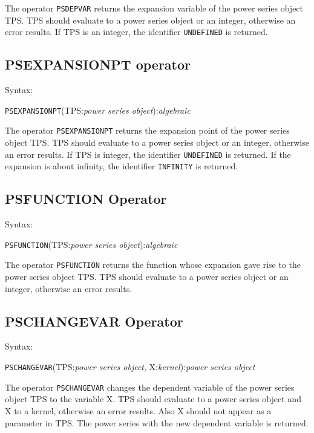 The operator {\tt PSDEPVAR} returns the expansion variable of the
power series object TPS. TPS should evaluate to a power
series object or an integer, otherwise an error results. If TPS
is an integer, the identifier {\tt UNDEFINED} is returned.

\subsection{PSEXPANSIONPT operator}

Syntax:

\hspace*{2em}
{\tt PSEXPANSIONPT}(TPS:{\em power series object}):{\em algebraic}

The operator {\tt PSEXPANSIONPT} returns the expansion point of the
power series object TPS. TPS should evaluate to a power
series object or an integer, otherwise an error results. If TPS
is integer, the identifier {\tt UNDEFINED} is returned. If the
expansion is about infinity, the identifier {\tt INFINITY} is
returned.

\subsection{PSFUNCTION Operator}

Syntax:

\hspace*{2em}
{\tt PSFUNCTION}(TPS:{\em power series object}):{\em algebraic}

The operator {\tt PSFUNCTION} returns the function whose expansion
gave rise to the power series object TPS. TPS should
evaluate to a power series object or an integer, otherwise an error
results.

\subsection{PSCHANGEVAR Operator}

Syntax:

\hspace*{2em} {\tt PSCHANGEVAR}(TPS:{\em power series object},
X:{\em kernel}):{\em power series object}

The operator {\tt PSCHANGEVAR} changes the dependent variable of the
power series object TPS to the variable X. TPS
should evaluate to a power series object and X to a kernel,
otherwise an error results.  Also X should not appear as a
parameter in TPS. The power series with the new dependent
variable is returned.

